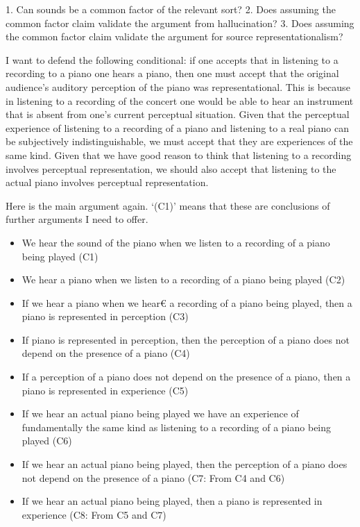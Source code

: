 \documentclass[sloppy, journal, git, bytitle, dodraft]{humapap}
\begin{document}
1. Can sounds be a common factor of the relevant sort?
2. Does assuming the common factor claim validate the argument from hallucination? 
3. Does assuming the common factor claim validate the argument for source representationalism? 
 

\sect



I want to defend the following conditional: if one accepts that in listening to a recording to a piano one hears a piano, then one must accept that the original audience’s auditory perception of the piano was representational. This is because in listening to a recording of the concert one would be able to hear an instrument that is absent from one’s current perceptual situation. Given that the perceptual experience of listening to a recording of a piano and listening to a real piano can be subjectively indistinguishable, we must accept that they are experiences of the same kind. Given that we have good reason to think that listening to a recording involves perceptual representation, we should also accept that listening to the actual piano involves perceptual representation. 

Here is the main argument again. `(C1)' means that these are conclusions of further arguments I need to offer.

\begin{itemize}
	\item We hear the sound of the piano when we listen to a recording of a piano being played (C1)
	\item We hear a piano when we listen to a recording of a piano being played (C2)
	\item If we hear a piano when we hear€ a recording of a piano being played, then a piano is represented in perception (C3)
	\item If piano is represented in perception, then the perception of a piano does not depend on the presence of a piano (C4) 
	\item If a perception of a piano does not depend on the presence of a piano, then a piano is represented in experience (C5)
	\item If we hear an actual piano being played we have an experience of fundamentally the same kind as listening to a recording of a piano being played (C6)
	\item If we hear an actual piano being played, then the perception of a piano does not depend on the presence of a piano (C7: From C4 and C6)
	\item If we hear an actual piano being played, then a piano is represented in experience (C8: From C5 and C7)
\end{itemize}

\printbibliography
\end{document}
